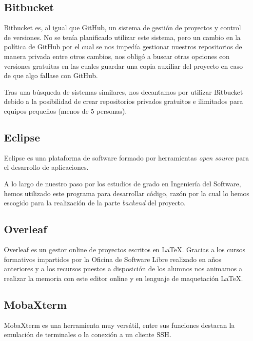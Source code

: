  

     \subsection{Bitbucket}
     Bitbucket\cite{bitbucket} es, al igual que GitHub, un sistema de gestión de proyectos y control de versiones. No se tenía planificado utilizar este sistema, pero un cambio en la política de GitHub por el cual se nos impedía gestionar nuestros repositorios de manera privada entre otros cambios, nos obligó a buscar otras opciones con versiones gratuitas en las cuales guardar una copia auxiliar del proyecto en caso de que algo fallase con GitHub.
     \newline
     
     Tras una búsqueda de sistemas similares, nos decantamos por utilizar Bitbucket debido a la posibilidad de crear repositorios privados gratuitos e ilimitados para equipos pequeños (menos de 5 personas). \newline
     
     \subsection{Eclipse}
     Eclipse\cite{eclipse} es una plataforma de software formado por herramientas \textit{open source} para el desarrollo de aplicaciones.
     \newline
     
     A lo largo de nuestro paso por los estudios de grado en Ingeniería del Software, hemos utilizado este programa para desarrollar código, razón por la cual lo hemos escogido para la realización de la parte \textit{backend} del proyecto.
     
     
     \subsection{Overleaf}
     Overleaf\cite{overleaf} es un gestor online de proyectos escritos en \LaTeX. Gracias a los cursos formativos impartidos por la Oficina de Software Libre\cite{ucmsoftwarelibre} realizado en años anteriores y a los recursos puestos a disposición de los alumnos\cite{recursoslatex} nos animamos a realizar la memoria con este editor online y en lenguaje de maquetación \LaTeX.
     
     
         \subsection{MobaXterm}
     MobaXterm\cite{mobaxterm} es una herramienta muy versátil, entre sus funciones destacan la emulación de terminales o la conexión a un cliente SSH.
     \newline 
     

